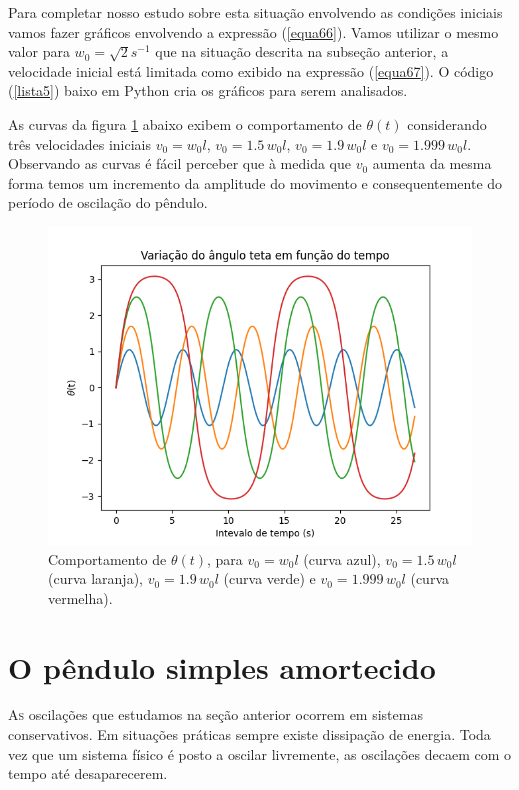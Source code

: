 \documentclass[12pt,openright,twoside,english,brazil]{abntex2}
\begin{document}
Para completar nosso estudo sobre esta situação envolvendo as condições iniciais vamos fazer gráficos envolvendo a expressão (\ref{equa66}). Vamos utilizar o mesmo valor para $w_0=\sqrt{2} s^{-1}$ que na situação descrita na subseção anterior, a velocidade inicial está limitada como exibido na expressão (\ref{equa67}). O código (\ref{lista5}) baixo em Python cria os gráficos para serem analisados.

As curvas da figura \ref{Figura9} abaixo exibem o comportamento de $\theta(t)$ considerando três velocidades iniciais $v_0=w_0l$, $v_0=1.5\, w_0l$, $v_0=1.9\, w_0l$ e $v_0=1.999\, w_0l$. Observando as curvas é fácil perceber que à medida que $v_0$ aumenta da mesma forma temos um incremento da amplitude do movimento e consequentemente do período de oscilação do pêndulo.



\begin{figure}[t]
 \centering
 \includegraphics[width=1.0\linewidth]{teta-tudo-2.png}
 \caption{Comportamento de $\theta(t)$, para $v_0=w_0l$ (curva azul), $v_0=1.5\, w_0l$ (curva laranja), $v_0=1.9\, w_0l$ (curva verde) e $v_0=1.999\, w_0l$ (curva vermelha).}
 \label{Figura9}
\end{figure}

\chapter[O pêndulo simples amortecido]{O pêndulo simples amortecido}
\lettrine[nindent=0.35em,lhang=0.40,loversize=0.3]{A}{s} oscilações que estudamos na seção anterior ocorrem em sistemas conservativos. Em situações práticas sempre existe dissipação de energia. Toda vez que um sistema físico é posto a oscilar livremente, as oscilações decaem com o tempo até desaparecerem.
\end{document}
